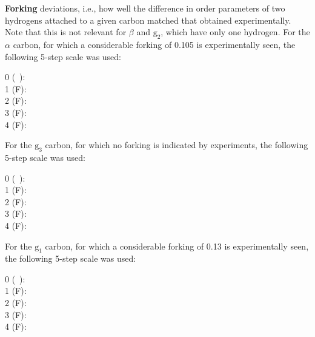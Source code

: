 \documentclass[journal=jpcbfk]{achemso}
\begin{document}
{\bf Forking} deviations, i.e., how well the difference in order parameters of two hydrogens attached to a given carbon matched that obtained experimentally. Note that this is not relevant for $\beta$ and $\mathrm{g_2}$, which have only one hydrogen. For the $\alpha$ carbon,  for which a considerable forking of 0.105 is experimentally seen, the following 5-step scale was used:
\begin{description}
\item [0 (~):] 
%
\item [1 ({\textsf{\tiny F}}):] 
%
\item [2  ({\textsf{\small F}}):] 
%
\item [3 ({\textsf{\large F}}):] 
%
\item [4 ({\textsf{\Large F}}):] 
\end{description}
%
For the $\mathrm{g_3}$ carbon, for which no forking is indicated by experiments, the following 5-step scale was used:
%
\begin{description}
\item [0 (~):] 
%
\item [1 ({\textsf{\tiny F}}):] 
%
\item [2  ({\textsf{\small F}}):] 
%
\item [3 ({\textsf{\large F}}):] 
%
\item [4 ({\textsf{\Large F}}):] 
\end{description}
%
For the $\mathrm{g_1}$ carbon, for which a considerable forking of 0.13 is experimentally seen, the following 5-step scale was used:
%
\begin{description}
\item [0 (~):] 
%
\item [1 ({\textsf{\tiny F}}):] 
%
\item [2  ({\textsf{\small F}}):] 
%
\item [3 ({\textsf{\large F}}):] 
%
\item [4 ({\textsf{\Large F}}):] 
\end{description}
\end{document}
